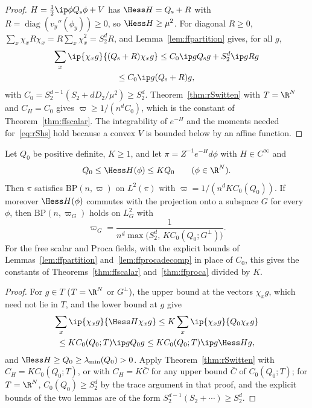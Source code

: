\begin{proof}
$H=\frac12\ip\phi{Q_{\rm s}\phi}+V$ has $\Hess H=Q_{\rm s}+R$ with $R=\operatorname{diag}
(v_y''(\phi_y))\ge0$, so $\Hess H\ge\mu^2$. For diagonal $R\ge0$,
$\sum_x\chi_xR\chi_x=R\sum_x\chi_x^2=S_2^dR$, and Lemma~\ref{lem:ffpartition}
gives, for all $g$,
\begin{multline*}
\sum_x\ip{\chi_xg}{(Q_{\rm s}+R)\chi_xg}\le C_0\ip g{Q_{\rm s}g}+S_2^d\ip gRg\\
\le C_0\ip g{(Q_{\rm s}+R)g},
\end{multline*}
with $C_0=S_2^{d-1}(S_2+dD_2/\mu^2)\ge S_2^d$. Theorem~\ref{thm:rSwitten}
with $T=\R^N$ and $C_H=C_0$ gives $\varpi\ge1/(n^dC_0)$, which is the
constant of Theorem~\ref{thm:ffscalar}. The integrability of $e^{-H}$ and
the moments needed for~\eqref{eq:rShs} hold because a convex $V$ is bounded
below by an affine function.
\end{proof}

\begin{corollary}\label{cor:rStwosided}
Let $Q_0$ be positive definite, $K\ge1$, and let $\pi=Z^{-1}e^{-H}d\phi$ with
$H\in C^\infty$ and
\[
Q_0\le\Hess H(\phi)\le KQ_0\qquad(\phi\in\R^N).
\]
Then $\pi$ satisfies $\mathrm{BP}(n,\varpi)$ on $L^2(\pi)$ with $\varpi=1/
(n^dKC_0(Q_0))$. If moreover $\Hess H(\phi)$ commutes with the projection
onto a subspace $G$ for every $\phi$, then $\mathrm{BP}(n,\varpi_G)$ holds on
$L^2_G$ with
\[
\varpi_G=\frac1{n^d\max\bigl(S_2^d,\,KC_0(Q_0;G^\perp)\bigr)}.
\]
For the free scalar and Proca
fields, with the explicit bounds of Lemmas~\ref{lem:ffpartition}
and~\ref{lem:ffprocadecomp} in place of $C_0$, this gives the constants of
Theorems~\ref{thm:ffscalar} and~\ref{thm:ffproca} divided by $K$.
\end{corollary}

\begin{proof}
For $g\in T$ ($T=\R^N$ or $G^\perp$), the upper bound at the vectors
$\chi_xg$, which need not lie in $T$, and the lower bound at $g$ give
\begin{multline*}
\sum_x\ip{\chi_xg}{\Hess H\chi_xg}\le K\sum_x\ip{\chi_xg}{Q_0\chi_xg}\\
\le KC_0(Q_0;T)\ip g{Q_0g}\le KC_0(Q_0;T)\ip g{\Hess Hg},
\end{multline*}
and $\Hess H\ge Q_0\ge\lambda_{\min}(Q_0)>0$. Apply
Theorem~\ref{thm:rSwitten} with $C_H=KC_0(Q_0;T)$, or with $C_H=K\bar C$
for any upper bound $\bar C$ of $C_0(Q_0;T)$; for $T=\R^N$, $C_0(Q_0)\ge
S_2^d$ by the trace argument in that proof, and the explicit bounds of the
two lemmas are of the form $S_2^{d-1}(S_2+\cdots)\ge S_2^d$.
\end{proof}

